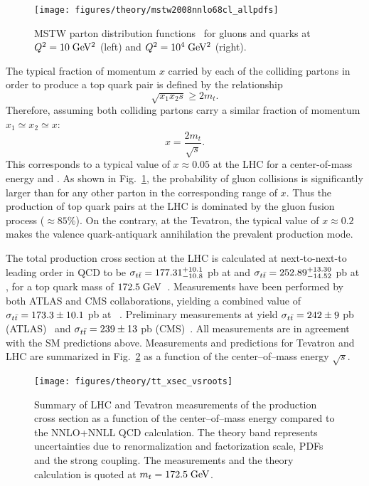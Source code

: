 \begin{figure}[!htb]\centering
  \texttt{[image: figures/theory/mstw2008nnlo68cl\_allpdfs]}
  \caption{MSTW parton distribution functions~\cite{ct10} for gluons
    and quarks at $Q^2=10\; \mathrm{GeV}{}^2$ (left) and $Q^2=10^4\; \mathrm{GeV}{}^2$ (right).}
  \label{fig:pdfs}
\end{figure}

The typical fraction of momentum $x$ carried by each of the colliding
partons in order to produce a top quark pair is defined by the
relationship
\begin{equation}
\sqrt{x_1x_2s}\geq{}2m_t.
\end{equation}
Therefore, assuming both colliding partons carry a similar fraction of momentum
$x_1\simeq{}x_2\simeq{}x$:
\begin{equation}
x=\frac{2m_t}{\sqrt{s}}
.
\end{equation}
This corresponds to a typical value of $x\approx{}0.05$ at the LHC for
a center-of-mass energy \seventev{} and \eighttev{}. As shown in
Fig.~\ref{fig:pdfs}, the probability of gluon collisions is
significantly larger than for any other parton in the corresponding
range of $x$. Thus the production of top quark pairs at the LHC is
dominated by the gluon fusion process ($\approx{}85\%$). On the
contrary, at the Tevatron, the typical value of $x\approx{}0.2$ makes
the valence quark-antiquark annihilation the prevalent \ttbar{}
production mode.

The total \ttbar{} production cross section at the LHC is calculated
at next-to-next-to leading order in
QCD to be
$\sigma_{t\bar{t}{}}=177.31^{+10.1}_{-10.8}$ pb at \seventev{} and
$\sigma_{t\bar{t}{}}=252.89^{+13.30}_{-14.52}$ pb at \eighttev{}, for a top quark mass of
$172.5 \; \mathrm{GeV}{}$~\cite{ttxs1,ttxs2,ttxs3,ttxs4,ttxs5,ttxs6,ttxs7}.
 Measurements have been performed by both ATLAS and CMS
collaborations, yielding a combined value of $\sigma_{t\bar{t}{}}=173.3\pm10.1$ pb at
\seventev{}~\cite{ATLAS-CONF-2012-134,CMS-PAS-TOP-12-003}. Preliminary
measurements at \eighttev{} yield $\sigma_{t\bar{t}{}}=242\pm{}9$ pb
(ATLAS)~\cite{Aad:2014kva} and $\sigma_{t\bar{t}{}}=239\pm{}13$ pb
(CMS)~\cite{Chatrchyan:2013faa}. All measurements are in agreement
with the SM predictions above. Measurements and predictions for
Tevatron and LHC are summarized in Fig.~\ref{fig:ttxs} as a function
of the center--of--mass energy $\sqrt{s}$.
\begin{figure}[!htb]\centering
  \texttt{[image: figures/theory/tt\_xsec\_vsroots]}
  \caption{Summary of LHC and Tevatron measurements of the \ttbar{}
    production cross section as a function of the center--of--mass
    energy compared to the NNLO+NNLL QCD calculation. The theory band
    represents uncertainties due to renormalization and factorization
    scale, PDFs and the strong coupling. The measurements and the
    theory calculation is quoted at $m_t=172.5 \; \mathrm{GeV}$.}
  \label{fig:ttxs}
\end{figure}

